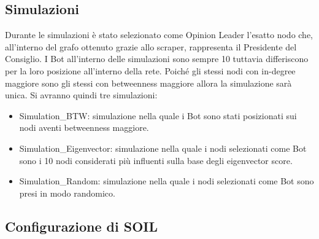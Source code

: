 \subsection{Simulazioni}
    Durante le simulazioni è stato selezionato come Opinion Leader l’esatto nodo che, all’interno del grafo ottenuto grazie allo scraper, rappresenta il Presidente del Consiglio. I Bot all’interno delle simulazioni sono sempre 10 tuttavia differiscono per la loro posizione all’interno della rete. Poiché gli stessi nodi con in-degree maggiore sono gli stessi con betweenness maggiore allora la simulazione sarà unica. Si avranno quindi tre simulazioni:
    \begin{itemize}
    \item Simulation\_BTW: simulazione nella quale i Bot sono stati posizionati sui nodi aventi betweenness maggiore.
    \item Simulation\_Eigenvector: simulazione nella quale i nodi selezionati come Bot sono i 10 nodi considerati più influenti sulla base degli eigenvector score.
    \item Simulation\_Random: simulazione nella quale i nodi selezionati come Bot sono presi in modo randomico.
    \end{itemize}
    \subsection{Configurazione di SOIL}\label{ConfigSoil}

